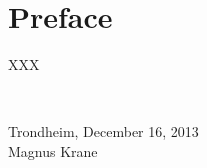 \section*{Preface}

		XXX


\mbox{}\\[10pc]
\begin{center}
Trondheim, December 16, 2013\\[1pc]
\vspace{15 mm}
Magnus Krane
\end{center}

\clearpage
